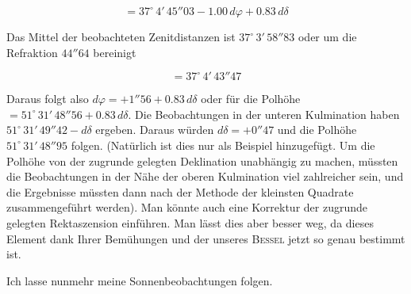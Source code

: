 \[ = 37^\circ\,4'\,45''03 - 1.00\,d\varphi + 0.83\,d\delta \]

\par\indent Das Mittel der beobachteten Zenitdistanzen ist $37^\circ\,3'\,58''83$ oder um die Refraktion $44''64$ bereinigt

\[ = 37^\circ\,4'\,43''47 \]

\par\indent Daraus folgt also $d\varphi = +1''56 + 0.83\,d\delta$ oder für die Polhöhe\newline \mbox{$= 51^\circ\,31'\,48''56 + 0.83\,d\delta$}. Die Beobachtungen in der unteren Kulmination haben $51^\circ\,31'\,49''42 - d\delta$ ergeben. Daraus würden $d\delta = +0''47$ und die Polhöhe $51^\circ\,31'\,48''95$ folgen. (Natürlich ist dies nur als Beispiel hinzugefügt. Um die Polhöhe von der zugrunde gelegten Deklination unabhängig zu machen, müssten die Beobachtungen in der Nähe der oberen Kulmination viel zahlreicher sein, und die Ergebnisse müssten dann nach der Methode der kleinsten Quadrate zusammengeführt werden). Man könnte auch eine Korrektur der zugrunde gelegten Rektaszension einführen. Man lässt dies aber besser weg, da dieses Element dank Ihrer Bemühungen und der unseres \textsc{Bessel} jetzt so genau bestimmt ist.

\par\indent Ich lasse nunmehr meine Sonnenbeobachtungen folgen.


